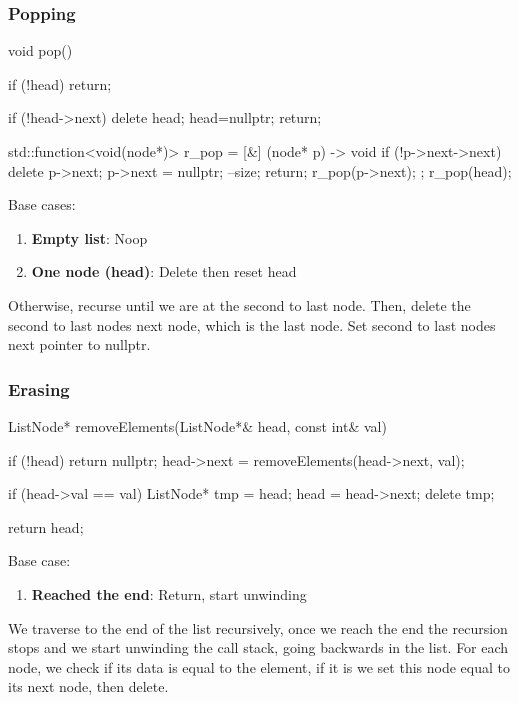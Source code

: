 \documentclass{report}
\begin{document}
\subsubsection{Popping}
\bigbreak \noindent 
\begin{cppcode}
    void pop() {
        if (!head) return;

        if (!head->next) {
            delete head;
            head=nullptr;
            return;
        }

        std::function<void(node*)> r_pop = [&] (node* p) -> void {
            if (!p->next->next) {
                delete p->next;
                p->next = nullptr;
                --size;
                return;
            }
            r_pop(p->next);
        };
        r_pop(head);
    }
\end{cppcode}
\bigbreak \noindent 
Base cases:
\begin{enumerate}
    \item \textbf{Empty list}: Noop
    \item \textbf{One node (head)}: Delete then reset head
\end{enumerate}
Otherwise, recurse until we are at the second to last node. Then, delete the second to last nodes next node, which is the last node. Set second to last nodes next pointer to nullptr.

\pagebreak 
\subsubsection{Erasing}
\bigbreak \noindent 
\begin{cppcode}
    ListNode* removeElements(ListNode*& head, const int& val) {
        if (!head) return nullptr;
        head->next = removeElements(head->next, val);

        if (head->val == val) {
            ListNode* tmp = head;
            head = head->next;
            delete tmp;
        }

        return head;
    }
\end{cppcode}
\bigbreak \noindent 
Base case:
\begin{enumerate}
    \item \textbf{Reached the end}: Return, start unwinding
\end{enumerate}
\bigbreak \noindent 
We traverse to the end of the list recursively, once we reach the end the recursion stops and we start unwinding the call stack, going backwards in the list.
\bigbreak \noindent 
For each node, we check if its data is equal to the element, if it is we set this node equal to its next node, then delete.
\end{document}
